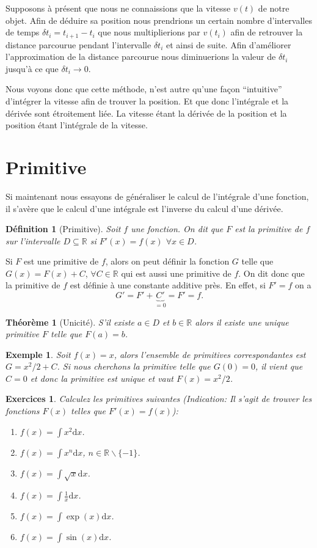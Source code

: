 \documentclass[a4paper,12pt]{book}
\newcommand{\real}{\mathbb{R}}
\newcommand{\dd}{\mathrm{d}}
\newtheorem{definition}{Définition}
\newtheorem*{exemple}{Exemple}
\newtheorem*{exercices}{Exercices}
\newtheorem{theoreme}{Théorème}
\begin{document}
Supposons à présent que nous ne connaissions que la vitesse $v(t)$ de notre objet. Afin de déduire sa position
nous prendrions un certain nombre d'intervalles de temps $\delta t_i=t_{i+1}-t_i$ que nous multiplierions
par $v(t_i)$ afin de retrouver la distance parcourue pendant l'intervalle $\delta t_i$
et ainsi de suite. Afin d'améliorer l'approximation de la distance parcourue 
nous diminuerions la valeur de $\delta t_i$ jusqu'à ce que $\delta t_i\rightarrow 0$.

Nous voyons donc que cette méthode, n'est autre qu'une façon ``intuitive'' d'intégrer la vitesse afin de trouver la position.
Et que donc l'intégrale et la dérivée sont étroitement liée. La vitesse étant la dérivée de la position et la position étant l'intégrale de la vitesse.


\section{Primitive}
Si maintenant nous essayons de généraliser le calcul de l'intégrale d'une fonction,
il s'avère que le calcul d'une intégrale est l'inverse du calcul d'une dérivée.

\begin{definition}[Primitive]
Soit $f$ une fonction. On dit que $F$ est la primitive de $f$ sur l'intervalle $D\subseteq\real$ si $F'(x)=f(x)$  $\forall x\in D$.
\end{definition}

Si $F$ est une primitive de $f$, alors on peut définir la fonction $G$ telle que $G(x)=F(x)+C$, $\forall C\in\real$ 
qui est aussi une primitive de $f$. On dit donc que la primitive de $f$ est définie à une constante additive près. En effet,
si $F'=f$ on a
\begin{equation}
 G'=F'+\underbrace{C'}_{=0}=F'=f.
\end{equation}
\begin{theoreme}[Unicité]
S'il existe $a\in D$ et $b\in\real$ alors il existe une unique primitive
$F$ telle que $F(a)=b$.
\end{theoreme}
\begin{exemple}
 Soit $f(x)=x$, alors l'ensemble de primitives correspondantes est $G=x^2/2+C$. Si nous cherchons la 
 primitive telle que $G(0)=0$, il vient que $C=0$ et donc la primitive est unique et vaut
 $F(x)=x^2/2$.
\end{exemple}
\begin{exercices}
Calculez les primitives suivantes (\textit{Indication: Il s'agit de trouver les fonctions $F(x)$ telles que $F'(x)=f(x)$}):
 \begin{enumerate}
  \item $f(x)=\int x^2\dd x$.
  \item $f(x)=\int x^n\dd x$, $n\in \real\backslash\{-1\}$.
  \item $f(x)=\int \sqrt{x}\dd x$.
  \item $f(x)=\int \frac{1}{x}\dd x$.
  \item $f(x)=\int \exp(x)\dd x$.
  \item $f(x)=\int \sin(x)\dd x$.
 \end{enumerate}
\end{exercices}
\end{document}
